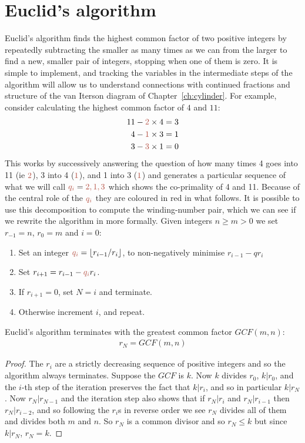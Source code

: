 \section{Euclid's algorithm}
\label{sec:euclid}
Euclid's algorithm finds the highest common factor of two positive integers by repeatedly subtracting the smaller as many times as we can from the larger to find a new, smaller pair of integers,  stopping when one of them is zero. It is  simple to implement, and tracking the variables in the intermediate steps of the algorithm will allow us to understand connections with continued fractions and structure of the van Iterson diagram of Chapter~\ref{ch:cylinder}.
For example, consider calculating the highest common factor of $4$ and $11$:
\begin{align}
	11 - {\jHeadingColour 2}\times 4 & = 3 
	\\
	4 - {\jHeadingColour 1}\times 3 & = 1\label{eq:411}
	\\
	3 - {\jHeadingColour 3}\times 1 & = 0 
\end{align}
This works by successively answering the question of how many times 4 goes into 11 (ie ${\jHeadingColour 2}$), 3 into 4  (${\jHeadingColour 1}$), and 1 into 3 (${\jHeadingColour 1}$) and generates 
a particular sequence of what we will call  $\jqi={\jHeadingColour 2, 1, 3}$ which shows the co-primality of 4 and 11. Because of the central role of the $\jqi$ they are coloured in red in what follows. It is possible to use this decomposition to compute the winding-number pair, which we can see if we rewrite the algorithm in more formally. 
Given integers $n\geq m>0$  we set $r_{-1}=n$, $r_0=m$ and $i=0$:
\begin{enumerate}
	\item Set an integer $\jqi=\lfloor r_{i-1}/r_i \rfloor $, to non-negatively minimise $r_{i-1}-q r_{i}$ 
	\item  Set  $r_{i+1}=r_{i-1}-\jqi r_{i}$. 
	\item If $r_{i+1}=0$, set $N=i$ and terminate.
	\item Otherwise increment $i$, and repeat.
\end{enumerate}
\begin{theorem}
	Euclid's algorithm terminates with the greatest common factor $GCF(m,n)$:
	\begin{eqnarray}
		r_N =  
		GCF(m,n) 
	\end{eqnarray}
\end{theorem}
\begin{proof}
	The $r_i$ are a strictly decreasing sequence of positive integers and so the algorithm always terminates. Suppose the $GCF$ is $k$. Now $k$ divides $r_0$, $k|r_0$, and the $i$-th step of the iteration preserves the fact that  $k|r_i$,  and so in particular $k|r_N$. Now $r_N|r_{N-1}$ and the iteration step also shows that if $r_N|r_i$ and $r_N|r_{i-1}$ then $r_N|r_{i-2}$, and so following the $r_i$s in reverse order we see $r_N$ divides all of them and divides both $m$ and $n$.  So $r_N$ is a common divisor and so $r_N\leq k$ but since $k|r_N$, $r_N=k$. 
\end{proof}

